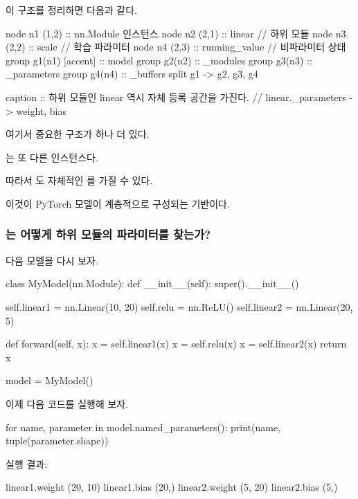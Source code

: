이 구조를 정리하면 다음과 같다.

\begin{dhkgraph}[uniform]
node n1 (1,2) :: nn.Module 인스턴스
node n2 (2,1) :: linear // 하위 모듈
node n3 (2,2) :: scale // 학습 파라미터
node n4 (2,3) :: running_value // 비파라미터 상태
group g1(n1) [accent] :: model
group g2(n2) :: _modules
group g3(n3) :: _parameters 
group g4(n4) :: _buffers
split g1 -> g2, g3, g4

caption :: 하위 모듈인 linear 역시 자체 등록 공간을 가진다. // linear._parameters -> weight, bias
\end{dhkgraph}

여기서 중요한 구조가 하나 더 있다.

는 또 다른  인스턴스다.

따라서 도 자체적인 를 가질 수 있다.

이것이 PyTorch 모델이 계층적으로 구성되는 기반이다.

\subsubsection{는 어떻게 하위 모듈의 파라미터를 찾는가?}

다음 모델을 다시 보자.

\begin{dhkcode}
class MyModel(nn.Module):
    def __init__(self):
        super().__init__()

        self.linear1 = nn.Linear(10, 20)
        self.relu = nn.ReLU()
        self.linear2 = nn.Linear(20, 5)

    def forward(self, x):
        x = self.linear1(x)
        x = self.relu(x)
        x = self.linear2(x)
        return x

model = MyModel()
\end{dhkcode}

이제 다음 코드를 실행해 보자.

\begin{dhkcode}
for name, parameter in model.named_parameters():
    print(name, tuple(parameter.shape))
\end{dhkcode}

실행 결과:

\begin{dhkzsh}
linear1.weight (20, 10)
linear1.bias (20,)
linear2.weight (5, 20)
linear2.bias (5,)
\end{dhkzsh}

